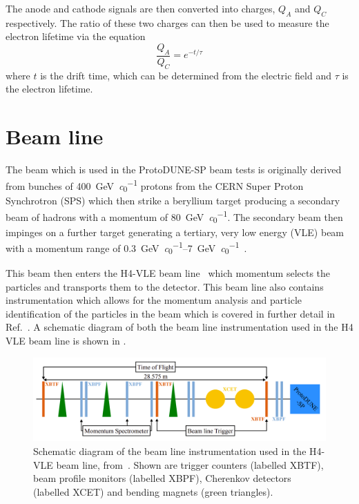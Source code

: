 The anode and cathode signals are then converted into charges, $Q_{A}$ and $Q_{C}$ respectively.
The ratio of these two charges can then be used to measure the electron lifetime via the equation
\begin{equation}
\frac{Q_{A}}{Q_{C}} = e^{-t/\tau}
\end{equation}
where $t$ is the drift time, which can be determined from the electric field and $\tau$ is the electron lifetime.

\section{Beam line}
\label{sec:protodune:beam}

The beam which is used in the ProtoDUNE-SP beam tests is originally derived from bunches of \SI{400}{\GeV\per\clight} protons from the CERN Super Proton Synchrotron (SPS) which then strike a beryllium target producing a secondary beam of hadrons with a momentum of \SI{80}{\GeV\per\clight}.
The secondary beam then impinges on a further target generating a tertiary, very low energy (VLE) beam with a momentum range of \SIrange{0.3}{7}{\GeV\per\clight}~\cite{protodunePerformance}.

This beam then enters the H4-VLE beam line~\cite{h4vle} which momentum selects the particles and transports them to the detector.
This beam line also contains instrumentation which allows for the momentum analysis and particle identification of the particles in the beam which is covered in further detail in Ref.~\cite{boothBeamLineInstr}.
A schematic diagram of both the beam line instrumentation used in the H4 VLE beam line is shown in .

\begin{figure}[h]
	\centering
	\includegraphics[width=\linewidth]{files/figures/protodune_detector/h4vleDiag}
	\caption[Schematic diagram of the beam line instrumentation used in the H4-VLE beam line]{Schematic diagram of the beam line instrumentation used in the H4-VLE beam line, from~\cite{protodunePerformance}. Shown are trigger counters (labelled XBTF), beam profile monitors (labelled XBPF), Cherenkov detectors (labelled XCET) and bending magnets (green triangles).}
	\label{fig:h4vleDiag}
\end{figure}

